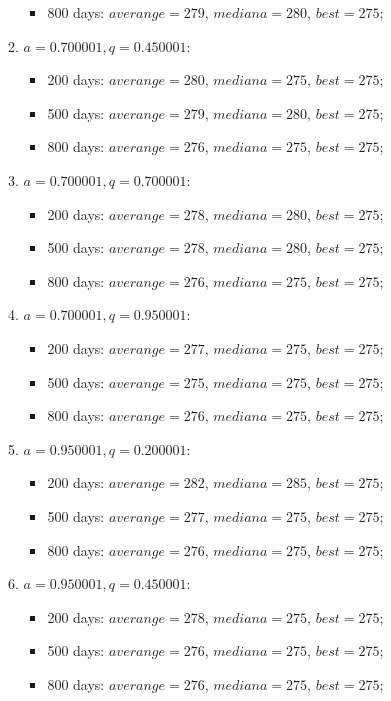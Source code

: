 \begin{enumerate}
\begin{enumerate}
\begin{itemize}
			\item 800 days: $averange = 279$, $mediana = 280$, $best = 275$;
		\end{itemize}
		\item $a= 0.700001, q= 0.450001$:
		\begin{itemize}
			\item 200 days: $averange = 280$, $mediana = 275$, $best = 275$;
			\item 500 days: $averange = 279$, $mediana = 280$, $best = 275$;
			\item 800 days: $averange = 276$, $mediana = 275$, $best = 275$;
		\end{itemize}
		\item $a= 0.700001, q= 0.700001$:
		\begin{itemize}
			\item 200 days: $averange = 278$, $mediana = 280$, $best = 275$;
			\item 500 days: $averange = 278$, $mediana = 280$, $best = 275$;
			\item 800 days: $averange = 276$, $mediana = 275$, $best = 275$;
		\end{itemize}
		\item $a= 0.700001, q= 0.950001$:
		\begin{itemize}
			\item 200 days: $averange = 277$, $mediana = 275$, $best = 275$;
			\item 500 days: $averange = 275$, $mediana = 275$, $best = 275$;
			\item 800 days: $averange = 276$, $mediana = 275$, $best = 275$;
		\end{itemize}
		\item $a= 0.950001, q= 0.200001$:
		\begin{itemize}
			\item 200 days: $averange = 282$, $mediana = 285$, $best = 275$;
			\item 500 days: $averange = 277$, $mediana = 275$, $best = 275$;
			\item 800 days: $averange = 276$, $mediana = 275$, $best = 275$;
		\end{itemize}
		\item $a= 0.950001, q= 0.450001$:
		\begin{itemize}
			\item 200 days: $averange = 278$, $mediana = 275$, $best = 275$;
			\item 500 days: $averange = 276$, $mediana = 275$, $best = 275$;
			\item 800 days: $averange = 276$, $mediana = 275$, $best = 275$;

\end{itemize}
\end{enumerate}
\end{enumerate}
